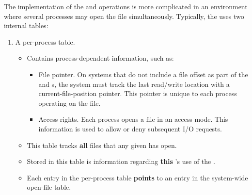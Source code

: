 The implementation of the  and  operations is more complicated in an environment where several processes may open the file simultaneously.
Typically, the  uses two internal tables:
\begin{enumerate}[noitemsep]
\item A per-process table.
  \begin{itemize}[noitemsep]
  \item Contains process-dependent information, such as:
    \begin{itemize}[noitemsep]
    \item File pointer.
      On systems that do not include a file offset as part of the  and  s, the system must track the last read/write location with a current-file-position pointer.
      This pointer is unique to each process operating on the file.
    \item Access rights.
      Each process opens a file in an access mode.
      This information is used to allow or deny subsequent I/O requests.
    \end{itemize}
  \item This table tracks \textbf{all} files that any given  has open.
  \item Stored in this table is information regarding \textbf{this} ’s use of the .
  \item Each entry in the per-process table \textbf{points} to an entry in the system-wide open-file table.
  \end{itemize}


\end{enumerate}
